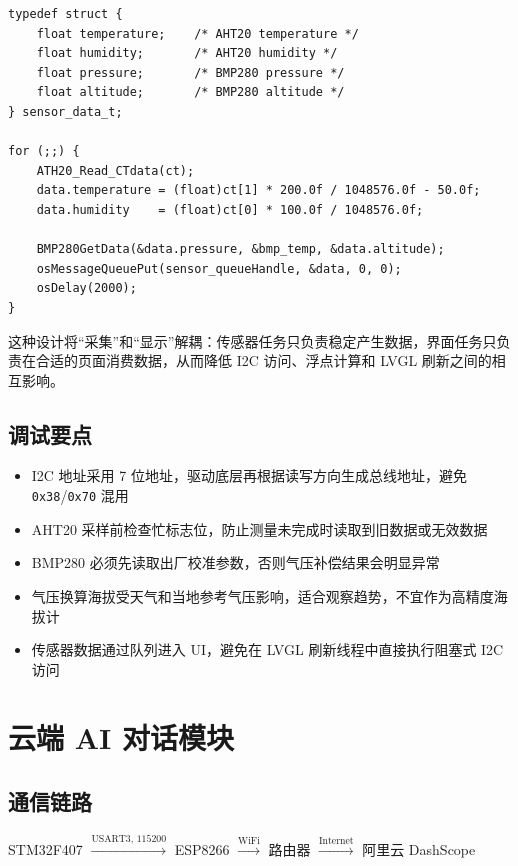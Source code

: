 \documentclass[12pt,a4paper]{ctexart}
\begin{document}
\begin{lstlisting}
typedef struct {
    float temperature;    /* AHT20 temperature */
    float humidity;       /* AHT20 humidity */
    float pressure;       /* BMP280 pressure */
    float altitude;       /* BMP280 altitude */
} sensor_data_t;

for (;;) {
    ATH20_Read_CTdata(ct);
    data.temperature = (float)ct[1] * 200.0f / 1048576.0f - 50.0f;
    data.humidity    = (float)ct[0] * 100.0f / 1048576.0f;

    BMP280GetData(&data.pressure, &bmp_temp, &data.altitude);
    osMessageQueuePut(sensor_queueHandle, &data, 0, 0);
    osDelay(2000);
}
\end{lstlisting}

这种设计将“采集”和“显示”解耦：传感器任务只负责稳定产生数据，界面任务只负责在合适的页面消费数据，从而降低 I2C 访问、浮点计算和 LVGL 刷新之间的相互影响。

\subsection{调试要点}

\begin{itemize}
    \item I2C 地址采用 7 位地址，驱动底层再根据读写方向生成总线地址，避免 \texttt{0x38}/\texttt{0x70} 混用
    \item AHT20 采样前检查忙标志位，防止测量未完成时读取到旧数据或无效数据
    \item BMP280 必须先读取出厂校准参数，否则气压补偿结果会明显异常
    \item 气压换算海拔受天气和当地参考气压影响，适合观察趋势，不宜作为高精度海拔计
    \item 传感器数据通过队列进入 UI，避免在 LVGL 刷新线程中直接执行阻塞式 I2C 访问
\end{itemize}

\section{云端 AI 对话模块}

\subsection{通信链路}

\begin{center}
STM32F407 $\xrightarrow{\text{USART3, 115200}}$ ESP8266 $\xrightarrow{\text{WiFi}}$ 路由器 $\xrightarrow{\text{Internet}}$ 阿里云 DashScope
\end{center}
\end{document}
